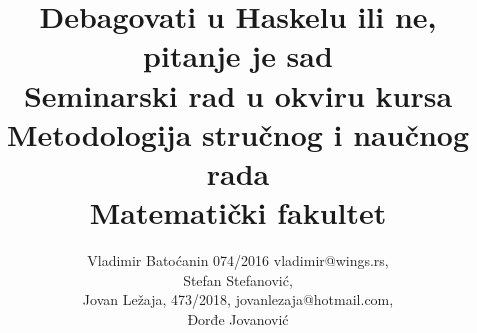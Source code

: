 \documentclass[a4paper]{article}
\begin{document}
\title{Debagovati u Haskelu ili ne, pitanje je sad\\ \small{Seminarski rad u okviru kursa\\Metodologija stručnog i naučnog rada\\ Matematički fakultet}}

\author{Vladimir Batoćanin 074/2016 vladimir@wings.rs,\\Stefan Stefanović,\\Jovan Ležaja, 473/2018, jovanlezaja@hotmail.com,\\Đorđe Jovanović}


\maketitle
\end{document}
